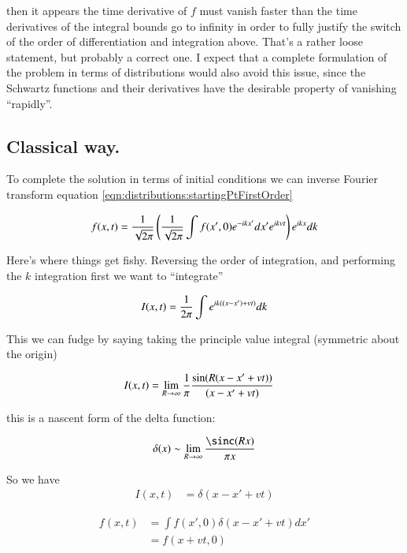 then
it appears the time derivative of $f$ must vanish faster than the time derivatives of the 
integral bounds go to infinity in order to fully justify the switch of 
the order of differentiation and integration above.  That's a rather loose statement, but probably a correct one.  I expect that
a complete formulation of the problem in terms of distributions would also avoid this issue, since the Schwartz functions and their 
derivatives have the desirable property of vanishing ``rapidly''.

\subsection{Classical way. }

To complete the solution in terms of initial conditions we can inverse Fourier transform
equation \ref{eqn:distributions:startingPtFirstOrder}

\begin{align*}
{{f}}(x,t) = \frac{1}{\sqrt{2\pi}} \left( \frac{1}{\sqrt{2\pi}}\int f(x',0) e^{-i k x'} dx' e^{i k v t} \right) e^{ i k x } dk
\end{align*}

Here's where things get fishy.  Reversing the order of integration, and performing
the $k$ integration first we want to ``integrate''

\begin{align*}
I(x,t) = \frac{1}{2\pi} \int e^{ i k ((x-x') + v t) } dk
\end{align*}

This we can fudge by saying taking the principle value integral (symmetric about the origin)

\begin{align*}
I(x,t) &= \lim_{R \rightarrow \infty} \frac{1}{\pi} \frac{\sin( R (x-x' + v t) )}{ (x-x' + vt)}
\end{align*}

this is a nascent form of the delta function:

\begin{align*}
\delta(x) \sim \lim_{R \rightarrow \infty} \frac{\sinc( R x )}{\pi x}
\end{align*}

So we have
\begin{align*}
I(x,t) &= \delta(x - x' + v t) 
\end{align*}

\begin{align*}
{{f}}(x,t) 
&= \int f(x',0) \delta(x - x' + v t) dx' \\
&= f(x + v t,0) 
\end{align*}

